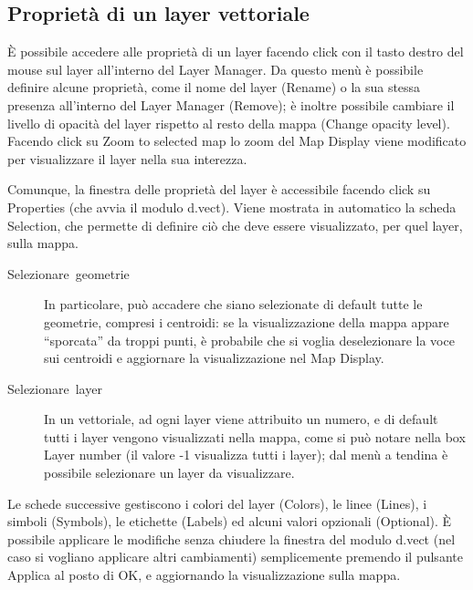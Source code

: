 	\subsection{Proprietà di un layer vettoriale}
		È possibile accedere alle proprietà di un layer facendo click con il tasto destro del mouse sul layer all'interno del Layer Manager.  Da questo menù è possibile definire alcune proprietà, come il nome del layer (\textsf{Rename}) o la sua stessa presenza all'interno del Layer Manager (\textsf{Remove}); è inoltre possibile cambiare il livello di opacità del layer rispetto al resto della mappa (\textsf{Change opacity level}). Facendo click su \textsf{Zoom to selected map} lo zoom del Map Display viene modificato per visualizzare il layer nella sua interezza.

		Comunque, la finestra delle proprietà del layer è accessibile facendo click su \textsf{Properties} (che avvia il modulo \textsf{d.vect}). Viene mostrata in automatico la scheda \textsf{Selection}, che permette di definire ciò che deve essere visualizzato, per quel layer, sulla mappa.
		
		\begin{description}
			\item [{Selezionare~geometrie}] In particolare, può accadere che siano selezionate di default tutte le geometrie, compresi i centroidi: se la visualizzazione della mappa appare ``sporcata'' da troppi punti, è probabile che si voglia deselezionare la voce sui centroidi e aggiornare la visualizzazione nel Map Display.
			\item [{Selezionare~layer}] In un vettoriale, ad ogni layer viene attribuito un numero, e di default tutti i layer vengono visualizzati nella mappa, come si può notare nella box \textsf{Layer number }(il valore -1 visualizza tutti i layer); dal menù a tendina è possibile selezionare un layer da visualizzare.
		\end{description}
		
		Le schede successive gestiscono i colori del layer (\textsf{Colors}), le linee (\textsf{Lines}), i simboli (\textsf{Symbols}), le etichette (\textsf{Labels}) ed alcuni valori opzionali (\textsf{Optional}). È possibile applicare le modifiche senza chiudere la finestra del modulo \textsf{d.vect} (nel caso si vogliano applicare altri cambiamenti) semplicemente premendo il pulsante \textsf{Applica} al posto di \textsf{OK}, e aggiornando la visualizzazione sulla mappa.
		
